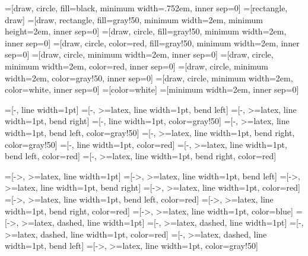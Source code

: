 \DeclareMathOperator{\Diag}{Diag} %
\DeclareMathOperator{\diag}{diag} %
\DeclareMathOperator{\mtov}{vec} %
\newcommand{\kro}{\otimes} %
\newcommand{\had}{\odot}   %

\newcommand{\nodesize}{2em}
\newcommand{\edgeunit}{2.5*\nodesize}
\newcommand{\edgewidth}{1pt}
=[draw, circle, fill=black, minimum width=.75\nodesize, inner sep=0]
=[rectangle, draw]
=[draw, rectangle, fill=gray!50, minimum width=\nodesize, minimum height=\nodesize, inner sep=0]
=[draw, circle, fill=gray!50, minimum width=\nodesize, inner sep=0]
=[draw, circle, color=red, fill=gray!50, minimum width=\nodesize, inner sep=0]
=[draw, circle, minimum width=\nodesize, inner sep=0]
=[draw, circle, minimum width=\nodesize, color=red, inner sep=0]
=[draw, circle, minimum width=\nodesize, color=gray!50, inner sep=0]
=[draw, circle, minimum width=\nodesize, color=white, inner sep=0]
=[color=white]
=[minimum width=\nodesize, inner sep=0]

=[-, line width=\edgewidth]
=[-, >=latex, line width=\edgewidth, bend left]
=[-, >=latex, line width=\edgewidth, bend right]
=[-, line width=\edgewidth, color=gray!50]
=[-, >=latex, line width=\edgewidth, bend left, color=gray!50]
=[-, >=latex, line width=\edgewidth, bend right, color=gray!50]
=[-, line width=\edgewidth, color=red]
=[-, >=latex, line width=\edgewidth, bend left, color=red]
=[-, >=latex, line width=\edgewidth, bend right, color=red]

=[->, >=latex, line width=\edgewidth]
=[->, >=latex, line width=\edgewidth, bend left]
=[->, >=latex, line width=\edgewidth, bend right]
=[->, >=latex, line width=\edgewidth, color=red]
=[->, >=latex, line width=\edgewidth, bend left, color=red]
=[->, >=latex, line width=\edgewidth, bend right, color=red]
=[->, >=latex, line width=\edgewidth, color=blue]
=[->, >=latex, dashed, line width=\edgewidth]
=[-, >=latex, dashed, line width=\edgewidth]
=[-, >=latex, dashed, line width=\edgewidth, color=red]
=[-, >=latex, dashed, line width=\edgewidth, bend left]
=[->, >=latex, line width=\edgewidth, color=gray!50]
